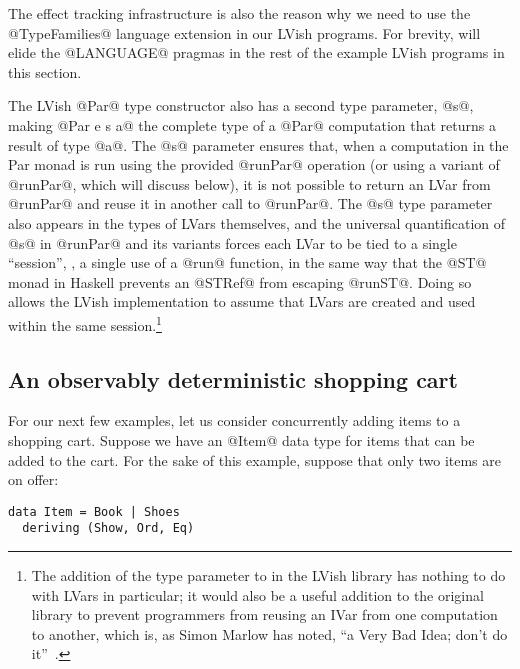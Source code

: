 The effect tracking infrastructure is also the reason why we need to
use the @TypeFamilies@ language extension in our LVish programs.  For
brevity,  will elide the @LANGUAGE@ pragmas in the rest
of the example LVish programs in this section.

The LVish @Par@ type constructor also has a second type parameter,
@s@, making @Par e s a@ the complete type of a @Par@ computation that
returns a result of type @a@.  The @s@ parameter ensures that, when a
computation in the Par monad is run using the provided @runPar@
operation (or using a variant of @runPar@, which  will discuss
below), it is not possible to return an LVar from @runPar@ and reuse
it in another call to @runPar@.  The @s@ type parameter also appears
in the types of LVars themselves, and the universal quantification of
@s@ in @runPar@ and its variants forces each LVar to be tied to a
single ``session'', \ie, a single use of a @run@ function, in the same
way that the @ST@ monad in Haskell prevents an @STRef@ from escaping
@runST@.  Doing so allows the LVish implementation to assume that
LVars are created and used within the same session.\footnote{The
  addition of the  type parameter to  in the LVish
  library has nothing to do with LVars in particular; it would also be
  a useful addition to the original  library to prevent
  programmers from reusing an IVar from one  computation to
  another, which is, as Simon Marlow has noted, ``a Very Bad Idea;
  don't do it''~\cite{marlow-book}.}

\subsection{An observably deterministic shopping cart}\label{subsection:lvish-container-lvars}

For our next few examples, let us consider concurrently adding items
to a shopping cart.  Suppose we have an @Item@ data type for items
that can be added to the cart.  For the sake of this example, suppose
that only two items are on offer:

\singlespacing
\begin{lstlisting}
data Item = Book | Shoes
  deriving (Show, Ord, Eq)
\end{lstlisting}
\doublespacing

